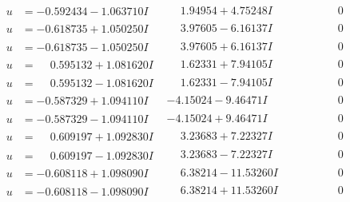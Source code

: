 \documentclass[1p]{elsarticle_modified}
\theoremstyle{definition}
\begin{document}
$$\begin{array}{c|c|c}
\begin{aligned}
u &= -0.592434 - 1.063710 I\end{aligned}
 & \phantom{-}1.94954 + 4.75248 I & \phantom{-0.000000 } 0 \\ \hline\begin{aligned}
u &= -0.618735 + 1.050250 I\end{aligned}
 & \phantom{-}3.97605 - 6.16137 I & \phantom{-0.000000 } 0 \\ \hline\begin{aligned}
u &= -0.618735 - 1.050250 I\end{aligned}
 & \phantom{-}3.97605 + 6.16137 I & \phantom{-0.000000 } 0 \\ \hline\begin{aligned}
u &= \phantom{-}0.595132 + 1.081620 I\end{aligned}
 & \phantom{-}1.62331 + 7.94105 I & \phantom{-0.000000 } 0 \\ \hline\begin{aligned}
u &= \phantom{-}0.595132 - 1.081620 I\end{aligned}
 & \phantom{-}1.62331 - 7.94105 I & \phantom{-0.000000 } 0 \\ \hline\begin{aligned}
u &= -0.587329 + 1.094110 I\end{aligned}
 & -4.15024 - 9.46471 I & \phantom{-0.000000 } 0 \\ \hline\begin{aligned}
u &= -0.587329 - 1.094110 I\end{aligned}
 & -4.15024 + 9.46471 I & \phantom{-0.000000 } 0 \\ \hline\begin{aligned}
u &= \phantom{-}0.609197 + 1.092830 I\end{aligned}
 & \phantom{-}3.23683 + 7.22327 I & \phantom{-0.000000 } 0 \\ \hline\begin{aligned}
u &= \phantom{-}0.609197 - 1.092830 I\end{aligned}
 & \phantom{-}3.23683 - 7.22327 I & \phantom{-0.000000 } 0 \\ \hline\begin{aligned}
u &= -0.608118 + 1.098090 I\end{aligned}
 & \phantom{-}6.38214 - 11.53260 I & \phantom{-0.000000 } 0 \\ \hline\begin{aligned}
u &= -0.608118 - 1.098090 I\end{aligned}
 & \phantom{-}6.38214 + 11.53260 I & \phantom{-0.000000 } 0 \\ \hline\begin{aligned}

\end{aligned}
\end{array}$$
\end{document}
